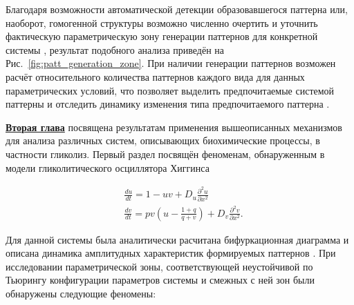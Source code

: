 Благодаря возможности автоматической детекции образовавшегося паттерна или, наоборот, гомогенной структуры возможно численно очертить и уточнить фактическую параметрическую зону генерации  паттернов для конкретной системы \cite{bib2}, результат подобного анализа приведён на Рис.~\ref{fig:patt_generation_zone}. При наличии генерации паттернов возможен расчёт относительного количества паттернов каждого вида для данных параметрических условий, что позволяет выделить предпочитаемые системой паттерны и отследить динамику изменения типа предпочитаемого паттерна \cite{bib4}.

\begin{figure}[ht]
\end{figure}

\underline{\textbf{Вторая глава}} посвящена результатам применения вышеописанных механизмов для анализа различных систем, описывающих биохимические процессы, в частности гликолиз. Первый раздел посвящён феноменам, обнаруженным в модели гликолитического осциллятора Хиггинса \cite{higgins1964chemical}

\begin{equation}
    \begin{aligned}
        & \frac{d u}{d t}=1-u v+D_u \frac{\partial^2 u}{\partial x^2} \\
        & \frac{d v}{d t}=p v\left(u-\frac{1+q}{q+v}\right)+D_v \frac{\partial^2 v}{\partial x^2} .
        \end{aligned}
\end{equation}

Для данной системы была аналитически расчитана бифуркационная диаграмма и описана динамика амплитудных характеристик формируемых паттернов \cite{bib1}. При исследовании параметрической зоны, соответствующей неустойчивой по Тьюрингу конфигурации параметров системы и смежных с ней зон были обнаружены следующие феномены:

